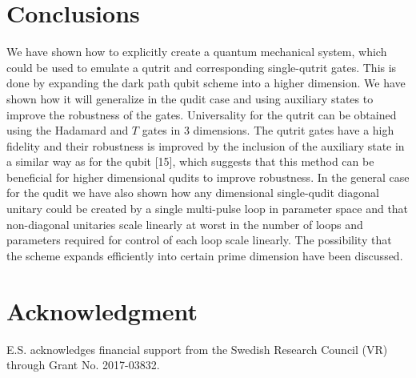 \documentclass[pra,showpacs,priprent,twocolumn,superscriptaddress]{revtex4-1}
\begin{document}
\section{Conclusions}
We have shown how to explicitly create a quantum mechanical system, which could be used to emulate a qutrit and corresponding single-qutrit gates. This is done by expanding the dark path qubit scheme \cite{ai22} into a higher dimension. We have shown how it will generalize in the qudit case and using auxiliary states to improve the robustness of the gates. Universality for the qutrit can be obtained using the Hadamard and $T$ gates in 3 dimensions. The qutrit gates have a high fidelity and their robustness is improved by the inclusion of the auxiliary state in a similar way as for the qubit [15], which suggests that this method can be beneficial for higher dimensional qudits to improve robustness. In the general case for the qudit we have also shown how any dimensional single-qudit diagonal unitary could be created by a single multi-pulse loop in parameter space and that non-diagonal unitaries scale linearly at worst in the number of loops and parameters required for control of each loop scale linearly. The possibility that the scheme expands efficiently into certain prime dimension have been discussed.

\section{Acknowledgment}
E.S. acknowledges financial support from the Swedish Research Council (VR) through 
Grant No. 2017-03832.
\end{document}
